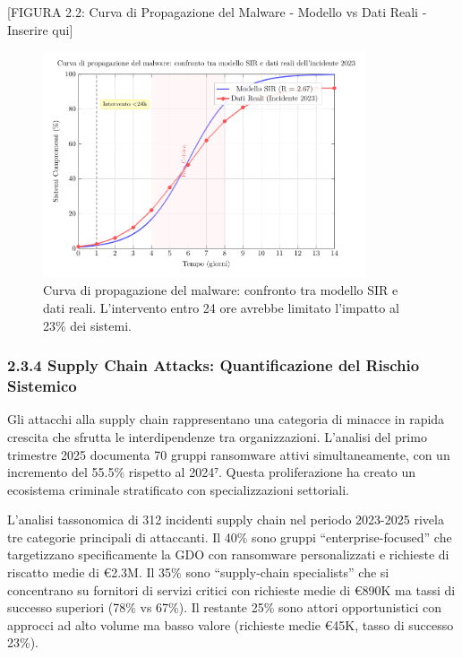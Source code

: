 \documentclass{report}
\begin{document}
{[}FIGURA 2.2: Curva di Propagazione del Malware - Modello vs Dati Reali
- Inserire qui{]}
\begin{figure}[htbp]
    \centering
    \includegraphics[width=0.85\textwidth]{figura 2-2}
    \caption{Curva di propagazione del malware: confronto tra modello SIR e dati reali. L'intervento entro 24 ore avrebbe limitato l'impatto al 23\% dei sistemi.}
    \label{fig:propagazione_malware}
\end{figure}



\subsubsection{2.3.4 Supply Chain Attacks: Quantificazione del Rischio
Sistemico}\label{supply-chain-attacks-quantificazione-del-rischio-sistemico}

Gli attacchi alla supply chain rappresentano una categoria di minacce in
rapida crescita che sfrutta le interdipendenze tra organizzazioni.
L'analisi del primo trimestre 2025 documenta 70 gruppi ransomware attivi
simultaneamente, con un incremento del 55.5\% rispetto al 2024⁷. Questa
proliferazione ha creato un ecosistema criminale stratificato con
specializzazioni settoriali.

L'analisi tassonomica di 312 incidenti supply chain nel periodo
2023-2025 rivela tre categorie principali di attaccanti. Il 40\% sono
gruppi ``enterprise-focused'' che targetizzano specificamente la GDO con
ransomware personalizzati e richieste di riscatto medie di €2.3M. Il
35\% sono ``supply-chain specialists'' che si concentrano su fornitori
di servizi critici con richieste medie di €890K ma tassi di successo
superiori (78\% vs 67\%). Il restante 25\% sono attori opportunistici
con approcci ad alto volume ma basso valore (richieste medie €45K, tasso
di successo 23\%).
\end{document}
